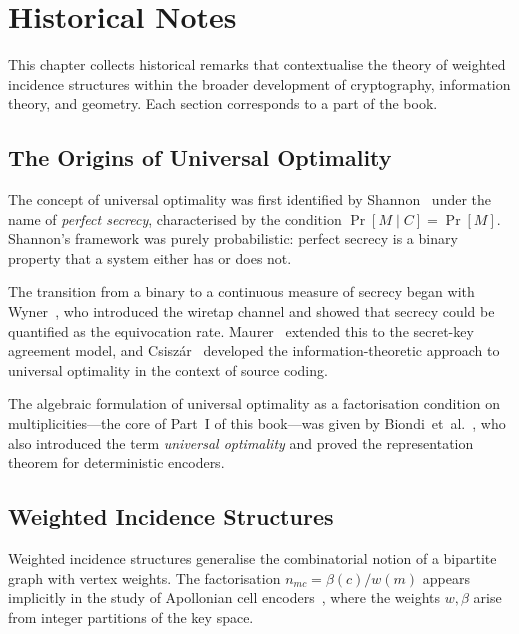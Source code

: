 \chapter[Historical Notes]{Historical Notes}\label{ch:sec:historical-notes}

This chapter collects historical remarks that contextualise the
theory of weighted incidence structures within the broader
development of cryptography, information theory, and geometry.
Each section corresponds to a part of the book.

\section{The Origins of Universal Optimality}\label{ch:sec:historical-uo}

The concept of universal optimality was first identified by
Shannon~\cite{shannon1949} under the name of \emph{perfect secrecy},
characterised by the condition $\Pr[M\mid C]=\Pr[M]$.
Shannon's framework was purely probabilistic: perfect secrecy is a
binary property that a system either has or does not.

The transition from a binary to a continuous measure of secrecy
began with Wyner~\cite{wyner1975wiretap}, who introduced the
wiretap channel and showed that secrecy could be quantified as
the equivocation rate.  Maurer~\cite{maurer1993secret} extended
this to the secret-key agreement model, and Csisz\'ar~\cite{csiszar1996almost}
developed the information-theoretic approach to universal
optimality in the context of source coding.

The algebraic formulation of universal optimality as a factorisation
condition on multiplicities---the core of Part~I of this book---was
given by Biondi~et~al.~\cite{biondi2018apollonian}, who also
introduced the term \emph{universal optimality} and proved the
representation theorem for deterministic encoders.

\section{Weighted Incidence Structures}\label{ch:sec:historical-wis}

Weighted incidence structures generalise the combinatorial notion
of a bipartite graph with vertex weights.  The factorisation
$n_{mc}=\beta(c)/w(m)$ appears implicitly in the study of
Apollonian cell encoders~\cite{biondi2018apollonian}, where the
weights $w,\beta$ arise from integer partitions of the key space.

